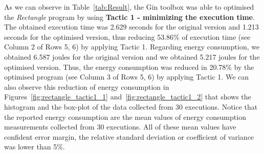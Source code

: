 As we can observe in Table~\ref{tab:Result}, the Gin toolbox was able to optimised the \textit{Rectangle} program by using \textbf{Tactic 1 - minimizing the execution time}. The obtained execution time was 2.629 seconds for the original version and 1.213 seconds for the optimised version, thus reducing 53.86\% of execution time (see Column 2 of Rows 5, 6) by applying Tactic 1. 
Regarding energy consumption, we obtained 6.587 joules for the original version and we obtained 5.217 joules for the optimised version. Thus, the energy consumption was reduced in 20.78\% by the optimised program (see Column 3 of Rows 5, 6) by applying Tactic 1.  
We can also observe this reduction of energy consumption in Figures~\ref{fig:rectangle_tactic1_1} and~\ref{fig:rectangle_tactic1_2} that shows the histogram and the box-plot of the data collected from 30 executions.
Notice that the reported energy consumption are the mean values of energy consumption measurements collected from 30 executions. All of these mean values have confident error margin, \ie the relative standard deviation or coefficient of variance was lower than 5\%.



